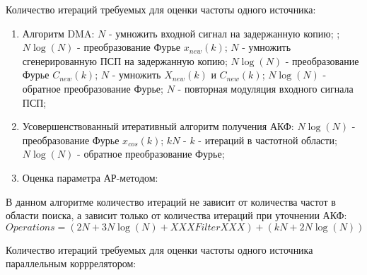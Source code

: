Количество итераций требуемых для оценки частоты одного источника:
\begin{enumerate}
\item Алгоритм DMA:
	\subitem[1] ${N}$ - умножить входной сигнал на задержанную копию;
	\subitem[2] ;
	\subitem[3] ${N \log (N)}$ - преобразование Фурье ${x_{new}(k)}$;
	\subitem[4] ${N}$ - умножить сгенерированную ПСП на задержанную копию;
	\subitem[5] ${N \log (N)}$ - преобразование Фурье ${C_{new}(k)}$;
	\subitem[6] ${N}$ - умножить ${X_{new}(k)}$ и ${C_{new}(k)}$;
	\subitem[7] ${N \log (N)}$ - обратное преобразование Фурье; 
	\subitem[8] ${N}$ - повторная модуляция входного сигнала ПСП;
\item Усовершенствованный итеративный алгоритм получения АКФ:
	\subitem[1] ${N \log (N)}$ - преобразование Фурье ${x_{cos}(k)}$;
	\subitem[2] ${kN}$ - ${k}$ - итераций в частотной области;
	\subitem[3] ${N \log (N)}$ - обратное преобразование Фурье;
\item Оценка параметра АР-методом:
\end{enumerate}

В данном алгоритме количество итераций не зависит от количества частот в области поиска,
а зависит только от количества итераций при уточнении  АКФ:
\begin{equation}
	Operations = \left( 2N + 3N \log (N) + XXXFilterXXX \right) + (kN + 2N \log (N)) 
\end{equation}

Количество итераций требуемых для оценки частоты одного источника параллельным корррелятором:
